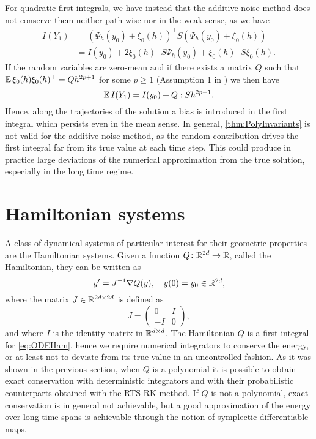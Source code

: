 \documentclass[final,onefignum,onetabnum]{siamonline171218}
\begin{document}
For quadratic first integrals, we have instead that the additive noise method does not conserve them neither path-wise nor in the weak sense, as we have
\begin{equation}
\begin{aligned}
	I(Y_1) &= (\Psi_h(y_0) + \xi_0(h))^\top  S (\Psi_h(y_0) + \xi_0(h)) \\
	&= I(y_0) + 2\xi_0(h)^\top  S  \Psi_h(y_0) + \xi_0(h)^\top  S \xi_0(h).
\end{aligned}
\end{equation}
If the random variables are zero-mean and if there exists a matrix $Q$ such that $\operatorname{\mathbb{E}}\xi_0(h)\xi_0(h)^\top  = Qh^{2p + 1}$ for some $p \geq 1$ (Assumption 1 in \cite{CGS16}) we then have
\begin{equation}\label{eq:BiasQuadraticAddNoise}
\E I(Y_1) = I(y_0) + Q : S h^{2p + 1}.
\end{equation}
Hence, along the trajectories of the solution a bias is introduced in the first integral which persists even in the mean sense. In general, \cref{thm:PolyInvariants} is not valid for the additive noise method, as the random contribution drives the first integral far from its true value at each time step. This could produce in practice large deviations of the numerical approximation from the true solution, especially in the long time regime.

\section{Hamiltonian systems}\label{sec:Hamiltonian} A class of dynamical systems of particular interest for their geometric properties are the Hamiltonian systems. Given a function $Q \colon \mathbb{R}^{2d} \to \mathbb{R}$, called the Hamiltonian, they can be written as
\begin{equation}\label{eq:ODEHam}
y' = J^{-1}\nabla Q(y), \quad y(0) = y_0 \in \R^{2d},
\end{equation}
where the matrix $J\in\mathbb{R}^{2d \times 2d}$ is defined as
\begin{equation}
J = \begin{pmatrix} 0 & I \\ -I & 0 \end{pmatrix},
\end{equation}
and where $I$ is the identity matrix in $\mathbb{R}^{d\times d}$. The Hamiltonian $Q$ is a first integral for \eqref{eq:ODEHam}, hence we require numerical integrators to conserve the energy, or at least not to deviate from its true value in an uncontrolled fashion. As it was shown in the previous section, when $Q$ is a polynomial it is possible to obtain exact conservation with deterministic integrators and with their probabilistic counterparts obtained with the RTS-RK method. If $Q$ is not a polynomial, exact conservation is in general not achievable, but a good approximation of the energy over long time spans is achievable through the notion of symplectic differentiable maps.
\end{document}
